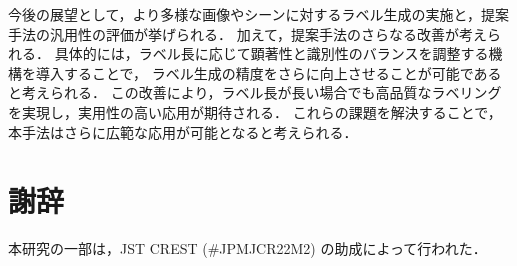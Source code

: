 \documentclass[a4paper,11pt]{jreport}
\begin{document}
今後の展望として，より多様な画像やシーンに対するラベル生成の実施と，提案手法の汎用性の評価が挙げられる．
加えて，提案手法のさらなる改善が考えられる．
具体的には，ラベル長に応じて顕著性と識別性のバランスを調整する機構を導入することで，
ラベル生成の精度をさらに向上させることが可能であると考えられる．
この改善により，ラベル長が長い場合でも高品質なラベリングを実現し，実用性の高い応用が期待される．
これらの課題を解決することで，本手法はさらに広範な応用が可能となると考えられる．

\chapter*{謝辞}

本研究の一部は，JST CREST (\#JPMJCR22M2) の助成によって行われた．

\newpage

\renewcommand{\bibname}{参考文献}



\end{document}

